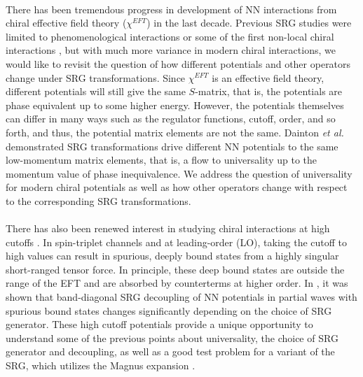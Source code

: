 \documentclass[preprintnumbers,floatfix,aps,prc,preprint,nofootinbib]{revtex4-1}
\begin{document}
\\
There has been tremendous progress in development of NN interactions from chiral effective field theory ($\chi^{EFT}$) in the last decade. Previous SRG studies were limited to phenomenological interactions or some of the first non-local chiral interactions \cite{Entem:2003ft}, but with much more variance in modern chiral interactions, we would like to revisit the question of how different potentials and other operators change under SRG transformations. Since $\chi^{EFT}$ is an effective field theory, different potentials will still give the same $S$-matrix, that is, the potentials are phase equivalent up to some higher energy. However, the potentials themselves can differ in many ways such as the regulator functions, cutoff, order, and so forth, and thus, the potential matrix elements are not the same. Dainton \textit{et al.} \cite{Dainton:2013axa} demonstrated SRG transformations drive different NN potentials to the same low-momentum matrix elements, that is, a flow to universality up to the momentum value of phase inequivalence. We address the question of universality for modern chiral potentials as well as how other operators change with respect to the corresponding SRG transformations.
\\

\\
There has also been renewed interest in studying chiral interactions at high cutoffs \cite{Tews:2018sbi}. In spin-triplet channels and at leading-order (LO), taking the cutoff to high values can result in spurious, deeply bound states from a highly singular short-ranged tensor force. In principle, these deep bound states are outside the range of the EFT and are absorbed by counterterms at higher order. In \cite{Wendt:2011qj}, it was shown that band-diagonal SRG decoupling of NN potentials in partial waves with spurious bound states changes significantly depending on the choice of SRG generator. These high cutoff potentials provide a unique opportunity to understand some of the previous points about universality, the choice of SRG generator and decoupling, as well as a good test problem for a variant of the SRG, which utilizes the Magnus expansion \cite{Morris:2015yna}.
\\
\end{document}
